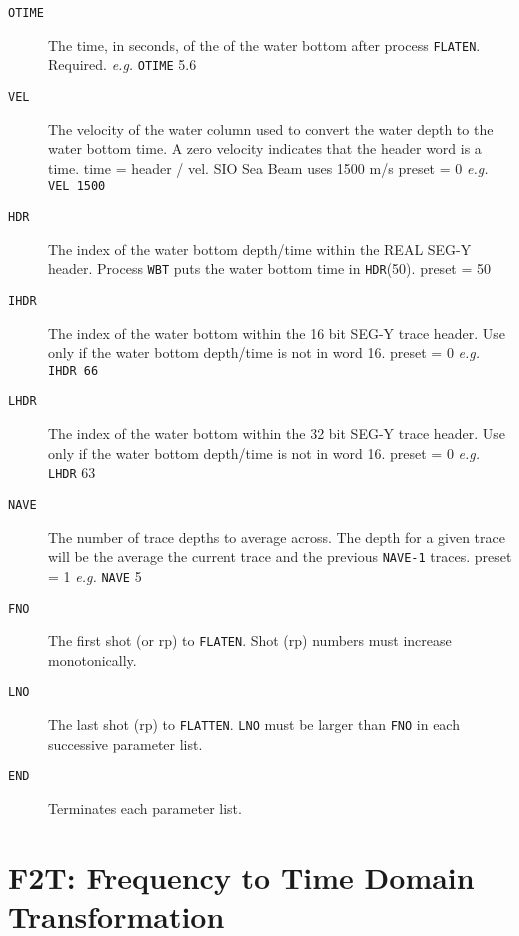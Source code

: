 \begin{description}
\item[\texttt{OTIME}] The time, in seconds, of the of the water bottom after process \texttt{FLATEN}.
         Required. \textit{e.g.} \texttt{OTIME} 5.6

\item[\texttt{VEL}] The velocity of the water column used to convert the water
         depth to the water bottom time.  A zero velocity indicates that
         the header word is a time.  time = header / vel.  SIO Sea Beam
         uses 1500 m/s
         \Gls{preset} = 0     \textit{e.g.} \texttt{VEL 1500}

\item[\texttt{HDR}] The index of the water bottom depth/time within the REAL SEG-Y
         header.  Process \texttt{WBT} puts the water bottom time in \texttt{HDR}(50).
         \Gls{preset} = 50

\item[\texttt{IHDR}] The index of the water bottom within the 16 bit SEG-Y trace
         header. Use only if the water bottom depth/time is not in
         word 16.
         \Gls{preset} = 0     \textit{e.g.}   \texttt{IHDR 66}

\item[\texttt{LHDR}] The index of the water bottom within the 32 bit SEG-Y trace
         header. Use only if the water bottom depth/time is not in
         word 16.
         \Gls{preset} = 0     \textit{e.g.}   \texttt{LHDR} 63

\item[\texttt{NAVE}] The number of trace depths to average across.  The depth for a
         given trace will be the average the current trace and the
         previous \texttt{NAVE-1} traces.
         \Gls{preset} = 1    \textit{e.g.}   \texttt{NAVE} 5

\item[\texttt{FNO}] The first \gls{shot} (or \gls{rp}) to \texttt{FLATEN}.  Shot (\gls{rp}) numbers must
         increase  monotonically.

\item[\texttt{LNO}] The last \gls{shot} (\gls{rp}) to \texttt{FLATTEN}.  \texttt{LNO} must be larger than \texttt{FNO} in
         each successive parameter list.

\item[\texttt{END}] Terminates each parameter list.
\end{description}

\section{F2T: Frequency to Time Domain Transformation}
\label{cmd_f2t}

